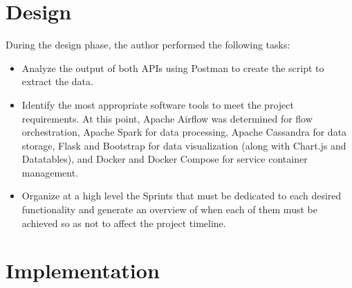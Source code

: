 \section{Design}

\nonzeroparskip During the design phase, the author performed the following tasks:
\begin{itemize}
	\item Analyze the output of both APIs using Postman to create the script to extract the data.
	\item Identify the most appropriate software tools to meet the project requirements. At this point, Apache Airflow was determined for flow orchestration, Apache Spark for data processing, Apache Cassandra for data storage, Flask and Bootstrap for data visualization (along with Chart.js and Datatables), and Docker and Docker Compose for service container management.
	\item Organize at a high level the Sprints that must be dedicated to each desired functionality and generate an overview of when each of them must be achieved so as not to affect the project timeline.
\end{itemize}

\section{Implementation}

